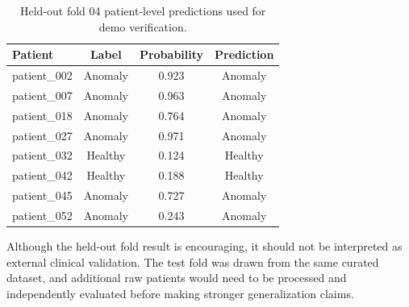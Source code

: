 \begin{table}[H]
    \centering
    \caption{Held-out fold 04 patient-level predictions used for demo verification.}
    \label{tab:heldout_demo}
    \begin{tabular}{l|c|c|c}
        \hline
        \textbf{Patient} & \textbf{Label} & \textbf{Probability} & \textbf{Prediction} \\
        \hline
        patient\_002 & Anomaly & 0.923 & Anomaly \\
        patient\_007 & Anomaly & 0.963 & Anomaly \\
        patient\_018 & Anomaly & 0.764 & Anomaly \\
        patient\_027 & Anomaly & 0.971 & Anomaly \\
        patient\_032 & Healthy & 0.124 & Healthy \\
        patient\_042 & Healthy & 0.188 & Healthy \\
        patient\_045 & Anomaly & 0.727 & Anomaly \\
        patient\_052 & Anomaly & 0.243 & Anomaly \\
        \hline
    \end{tabular}
\end{table}

Although the held-out fold result is encouraging, it should not be interpreted as external clinical validation. The test fold was drawn from the same curated dataset, and additional raw patients would need to be processed and independently evaluated before making stronger generalization claims.
